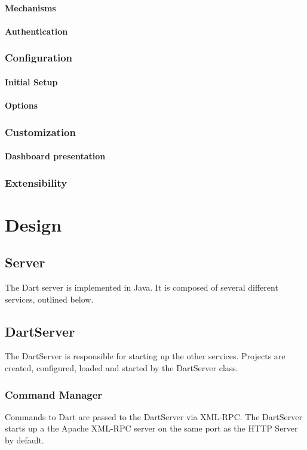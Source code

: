 \documentclass{InsightBook}
\begin{document}
\subsubsection{Mechanisms}
\subsubsection{Authentication}

\subsection{Configuration}
\subsubsection{Initial Setup}
\subsubsection{Options}

\subsection{Customization}
  \subsubsection{Dashboard presentation}
\subsection{Extensibility}

\chapter{Design}

\section{Server}
The Dart server is implemented in Java.  It is composed of several
different services, outlined below.

\section{DartServer}
The DartServer is responsible for starting up the other services.
Projects are created, configured, loaded and started by the DartServer
class.

\subsection{Command Manager}
Commands to Dart are passed to the DartServer via XML-RPC.  The
DartServer starts up a the Apache XML-RPC server on the same port as
the HTTP Server by default.
\end{document}
